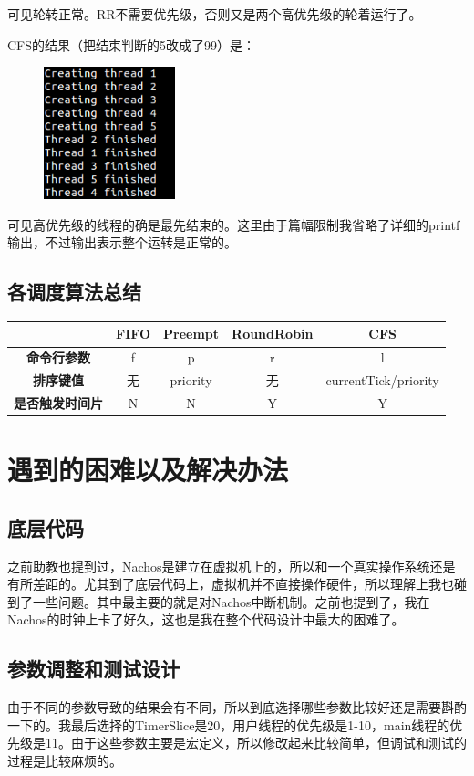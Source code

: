 \documentclass[nofonts]{ctexart}
\begin{document}
可见轮转正常。RR不需要优先级，否则又是两个高优先级的轮着运行了。

CFS的结果（把结束判断的5改成了99）是：
\begin{figure}[h!]
 \centering
\includegraphics[width=1.5in]{ex25.png}
\end{figure}

可见高优先级的线程的确是最先结束的。这里由于篇幅限制我省略了详细的printf输出，不过输出表示整个运转是正常的。

\subsection*{各调度算法总结}
\begin{table}[h]
\centering
\footnotesize
\begin{tabular}{|c|c|c|c|c|}\hline
& \textbf{FIFO} & \textbf{Preempt} & \textbf{RoundRobin} & \textbf{CFS} \\\hline
\textbf{命令行参数} & f & p & r & l \\\hline
\textbf{排序键值} & 无 & priority & 无 & currentTick/priority \\\hline
\textbf{是否触发时间片} & N & N & Y & Y \\\hline
\end{tabular}
\end{table}


\section{遇到的困难以及解决办法}
\subsection*{底层代码}
之前助教也提到过，Nachos是建立在虚拟机上的，所以和一个真实操作系统还是有所差距的。尤其到了底层代码上，虚拟机并不直接操作硬件，所以理解上我也碰到了一些问题。其中最主要的就是对Nachos中断机制。之前也提到了，我在Nachos的时钟上卡了好久，这也是我在整个代码设计中最大的困难了。
\subsection*{参数调整和测试设计}
由于不同的参数导致的结果会有不同，所以到底选择哪些参数比较好还是需要斟酌一下的。我最后选择的TimerSlice是20，用户线程的优先级是1-10，main线程的优先级是11。由于这些参数主要是宏定义，所以修改起来比较简单，但调试和测试的过程是比较麻烦的。
\end{document}

